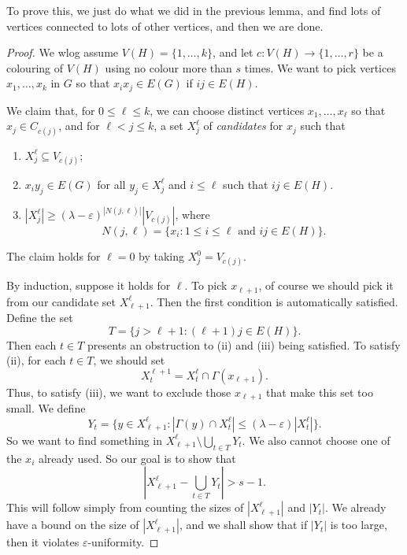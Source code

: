 \documentclass[a4paper]{article}
\begin{document}
To prove this, we just do what we did in the previous lemma, and find lots of vertices connected to lots of other vertices, and then we are done.
\begin{proof}
  We wlog assume $V(H) = \{1, \ldots, k\}$, and let $c: V(H) \to \{1, \ldots, r\}$ be a colouring of $V(H)$ using no colour more than $s$ times. We want to pick vertices $x_1, \ldots, x_k$ in $G$ so that $x_i x_j \in E(G)$ if $ij \in E(H)$.

  We claim that, for $0 \leq \ell \leq k$, we can choose distinct vertices $x_1, \ldots, x_\ell$ so that $x_j \in C_{c(j)}$, and for $\ell < j \leq k$, a set $X^{\ell}_j$ of \emph{candidates} for $x_j$ such that
  \begin{enumerate}
    \item $X_j^{\ell} \subseteq V_{c(j)}$;
    \item $x_i y_j \in E(G)$ for all $y_j \in X_j^{\ell}$ and $i \leq \ell$ such that $ij \in E(H)$.

    \item $|X_j^{\ell}| \geq (\lambda - \varepsilon)^{|N(j, \ell)|} |V_{c(j)}|$, where
      \[
        N(j, \ell) = \{x_i: 1 \leq i \leq \ell \text{ and }ij \in E(H)\}.
      \]
  \end{enumerate}

  The claim holds for $\ell = 0$ by taking $X_j^0 = V_{c(j)}$.

  By induction, suppose it holds for $\ell$. To pick $x_{\ell + 1}$, of course we should pick it from our candidate set $X_{\ell + 1}^\ell$. Then the first condition is automatically satisfied. Define the set
  \[
    T = \{j > \ell + 1 : (\ell + 1)j \in E(H)\}.
  \]
  Then each $t \in T$ presents an obstruction to (ii) and (iii) being satisfied. To satisfy (ii), for each $t \in T$, we should set
  \[
    X^{\ell + 1}_t = X_t^\ell \cap \Gamma(x_{\ell + 1}).
  \]
  Thus, to satisfy (iii), we want to exclude those $x_{\ell + 1}$ that make this set too small. We define
  \[
    Y_t = \Big\{y \in X_{\ell + 1}^{\ell} : |\Gamma(y) \cap X_t^\ell| \leq (\lambda - \varepsilon) |X^{\ell}_t|\Big\}.
  \]
  So we want to find something in $X_{\ell + 1}^\ell \setminus \bigcup_{t \in T} Y_t$. We also cannot choose one of the $x_i$ already used. So our goal is to show that
  \[
    \left|X_{\ell + 1}^{\ell} - \bigcup_{t \in T} Y_t \right| > s - 1.
  \]
  This will follow simply from counting the sizes of $|X_{\ell + 1}^\ell|$ and $|Y_t|$. We already have a bound on the size of $|X_{\ell + 1}^\ell|$, and we shall show that if $|Y_t|$ is too large, then it violates $\varepsilon$-uniformity.


\end{proof}
\end{document}
